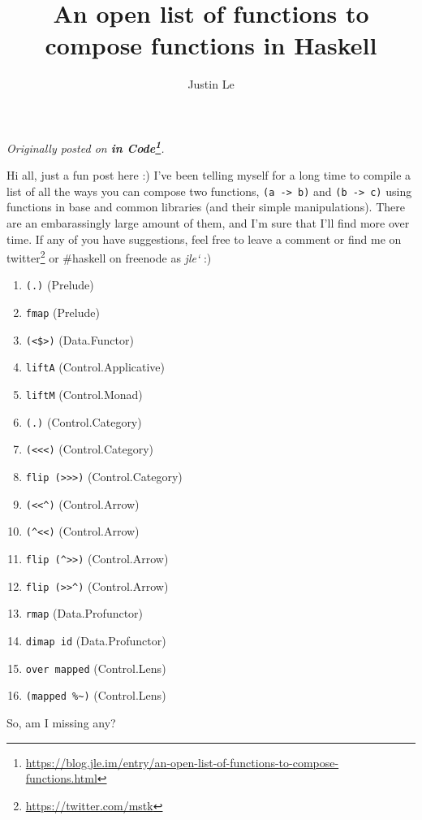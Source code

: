 \documentclass[]{article}
\title{An open list of functions to compose functions in Haskell}
\author{Justin Le}
\renewcommand{\href}[2]{#2\footnote{\url{#1}}}
\begin{document}
\maketitle

\emph{Originally posted on
\textbf{\href{https://blog.jle.im/entry/an-open-list-of-functions-to-compose-functions.html}{in
Code}}.}

Hi all, just a fun post here :) I've been telling myself for a long time
to compile a list of all the ways you can compose two functions,
\texttt{(a\ -\textgreater{}\ b)} and \texttt{(b\ -\textgreater{}\ c)}
using functions in base and common libraries (and their simple
manipulations). There are an embarassingly large amount of them, and I'm
sure that I'll find more over time. If any of you have suggestions, feel
free to leave a comment or find me on
\href{https://twitter.com/mstk}{twitter} or \#haskell on freenode as
\emph{jle`} :)

\begin{enumerate}
\def\labelenumi{\arabic{enumi}.}
\tightlist
\item
  \texttt{(.)} (Prelude)
\item
  \texttt{fmap} (Prelude)
\item
  \texttt{(\textless{}\$\textgreater{})} (Data.Functor)
\item
  \texttt{liftA} (Control.Applicative)
\item
  \texttt{liftM} (Control.Monad)
\item
  \texttt{(.)} (Control.Category)
\item
  \texttt{(\textless{}\textless{}\textless{})} (Control.Category)
\item
  \texttt{flip\ (\textgreater{}\textgreater{}\textgreater{})}
  (Control.Category)
\item
  \texttt{(\textless{}\textless{}\^{})} (Control.Arrow)
\item
  \texttt{(\^{}\textless{}\textless{})} (Control.Arrow)
\item
  \texttt{flip\ (\^{}\textgreater{}\textgreater{})} (Control.Arrow)
\item
  \texttt{flip\ (\textgreater{}\textgreater{}\^{})} (Control.Arrow)
\item
  \texttt{rmap} (Data.Profunctor)
\item
  \texttt{dimap\ id} (Data.Profunctor)
\item
  \texttt{over\ mapped} (Control.Lens)
\item
  \texttt{(mapped\ \%\textasciitilde{})} (Control.Lens)
\end{enumerate}

So, am I missing any?
\end{document}
